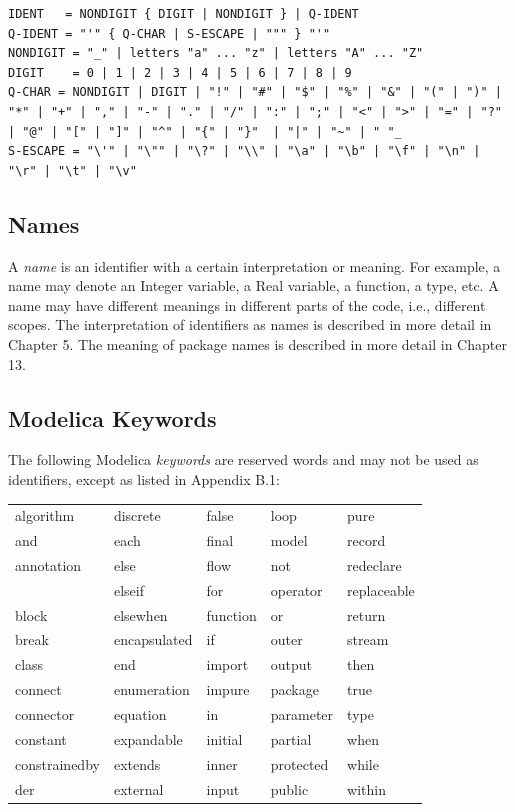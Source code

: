 \documentclass[10pt,a4paper]{report}
\begin{document}

\begin{lstlisting}[language=grammar]
IDENT   = NONDIGIT { DIGIT | NONDIGIT } | Q-IDENT
Q-IDENT = "'" { Q-CHAR | S-ESCAPE | """ } "'"
NONDIGIT = "_" | letters "a" ... "z" | letters "A" ... "Z"
DIGIT    = 0 | 1 | 2 | 3 | 4 | 5 | 6 | 7 | 8 | 9
Q-CHAR = NONDIGIT | DIGIT | "!" | "#" | "$" | "%" | "&" | "(" | ")" | "*" | "+" | "," | "-" | "." | "/" | ":" | ";" | "<" | ">" | "=" | "?" | "@" | "[" | "]" | "^" | "{" | "}"  | "|" | "~" | " "_
S-ESCAPE = "\'" | "\"" | "\?" | "\\" | "\a" | "\b" | "\f" | "\n" | "\r" | "\t" | "\v"
\end{lstlisting}

\subsection{Names}

A \emph{name} is an identifier with a certain interpretation or meaning.
For example, a name may denote an Integer variable, a Real variable, a
function, a type, etc. A name may have different meanings in different
parts of the code, i.e., different scopes. The interpretation of
identifiers as names is described in more detail in Chapter 5. The
meaning of package names is described in more detail in Chapter 13.

\subsection{Modelica Keywords}

The following Modelica \emph{keywords} are reserved words and may not be
used as identifiers, except as listed in Appendix B.1:

\begin{longtable}[c]{@{}lllll@{}}
algorithm & discrete & false & loop & pure\tabularnewline
and & each & final & model & record\tabularnewline
annotation & else & flow & not & redeclare\tabularnewline
& elseif & for & operator & replaceable\tabularnewline
block & elsewhen & function & or & return\tabularnewline
break & encapsulated & if & outer & stream\tabularnewline
class & end & import & output & then\tabularnewline
connect & enumeration & impure & package & true\tabularnewline
connector & equation & in & parameter & type\tabularnewline
constant & expandable & initial & partial & when\tabularnewline
constrainedby & extends & inner & protected & while\tabularnewline
der & external & input & public & within\tabularnewline
\end{longtable}
\end{document}
